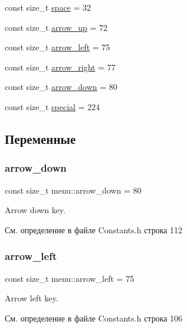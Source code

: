 \begin{DoxyCompactItemize}
\item 
const size\+\_\+t \hyperlink{namespacemenu_a480dcaab18029e9e82979360297d9841}{space} = 32
\item 
const size\+\_\+t \hyperlink{namespacemenu_a5e6bc193fc3cb9a0cfce7370a1578aeb}{arrow\+\_\+up} = 72
\item 
const size\+\_\+t \hyperlink{namespacemenu_a971b85d59fefa12b99efe533fa977e8f}{arrow\+\_\+left} = 75
\item 
const size\+\_\+t \hyperlink{namespacemenu_a5ac4dac780ca5b41b206c7ddf5f9905e}{arrow\+\_\+right} = 77
\item 
const size\+\_\+t \hyperlink{namespacemenu_a23e79ce5c613d90b85f9a2c064f610f3}{arrow\+\_\+down} = 80
\item 
const size\+\_\+t \hyperlink{namespacemenu_af11c563a29975fcfa8a0bac77b2630f7}{special} = 224
\end{DoxyCompactItemize}


\subsection{Переменные}
\mbox{\label{namespacemenu_a23e79ce5c613d90b85f9a2c064f610f3}} 
\subsubsection{\texorpdfstring{arrow\+\_\+down}{arrow\_down}}
{\footnotesize\ttfamily const size\+\_\+t menu\+::arrow\+\_\+down = 80}

Arrow down key. 

См. определение в файле Constants.\+h строка 112

\mbox{\label{namespacemenu_a971b85d59fefa12b99efe533fa977e8f}} 
\subsubsection{\texorpdfstring{arrow\+\_\+left}{arrow\_left}}
{\footnotesize\ttfamily const size\+\_\+t menu\+::arrow\+\_\+left = 75}

Arrow left key. 

См. определение в файле Constants.\+h строка 106

\mbox{\label{namespacemenu_a5ac4dac780ca5b41b206c7ddf5f9905e}} 
